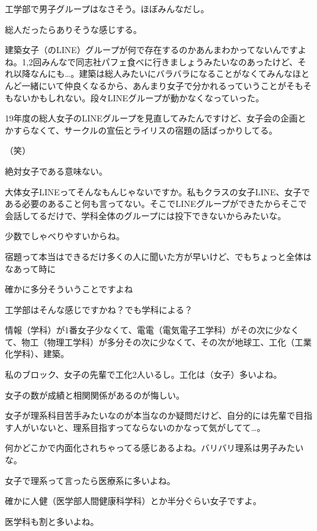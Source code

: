 \begin{multicols}{2}
  工学部で男子グループはなさそう。ほぼみんなだし。

  総人だったらありそうな感じする。

  建築女子（のLINE）グループが何で存在するのかあんまわかってないんですよね。1,2回みんなで同志社パフェ食べに行きましょうみたいなのあったけど、それ以降なんにも…。建築は総人みたいにバラバラになることがなくてみんなほとんど一緒にいて仲良くなるから、あんまり女子で分かれるっていうことがそもそもないかもしれない。段々LINEグループが動かなくなっていった。

  19年度の総人女子のLINEグループを見直してみたんですけど、女子会の企画とかすらなくて、サークルの宣伝とライリスの宿題の話ばっかりしてる。

  （笑）

  絶対女子である意味ない。

  大体女子LINEってそんなもんじゃないですか。私もクラスの女子LINE、女子である必要のあること何も言ってない。そこでLINEグループができたからそこで会話してるだけで、学科全体のグループには投下できないからみたいな。

  少数でしゃべりやすいからね。

  宿題って本当はできるだけ多くの人に聞いた方が早いけど、でもちょっと全体はなあって時に

  確かに多分そういうことですよね

  工学部はそんな感じですかね？でも学科による？

  情報（学科）が1番女子少なくて、電電（電気電子工学科）がその次に少なくて、物工（物理工学科）が多分その次に少なくて、その次が地球工、工化（工業化学科）、建築。

  私のブロック、女子の先輩で工化2人いるし。工化は（女子）多いよね。

  女子の数が成績と相関関係があるのが悔しい。

  女子が理系科目苦手みたいなのが本当なのか疑問だけど、自分的には先輩で目指す人がいないと、理系目指すってならないのかなって気がしてて…。

  何かどこかで内面化されちゃってる感じあるよね。バリバリ理系は男子みたいな。

  女子で理系って言ったら医療系に多いよね。

  確かに人健（医学部人間健康科学科）とか半分ぐらい女子ですよ。

  医学科も割と多いよね。


\end{multicols}
